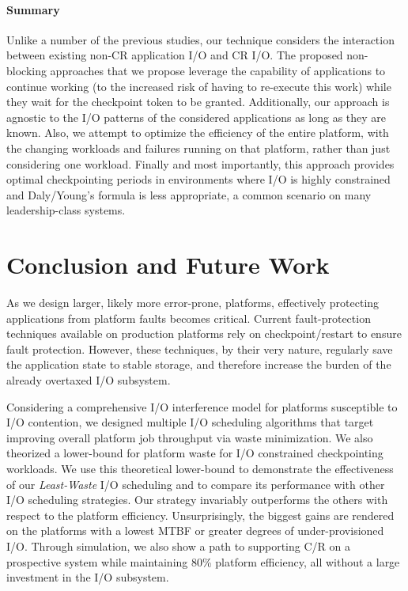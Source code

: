 \documentclass[conference,nofonttune]{IEEEtran}
\newcommand{\leastwaste}{\emph{Least-Waste}\xspace}
\def\cooperative{\leastwaste}
\begin{document}
\paragraph*{Summary}

Unlike a number of the previous studies, our
technique considers the interaction between existing non-CR
application I/O and CR I/O. The proposed non-blocking approaches that
we propose leverage the capability of applications to continue working
(to the increased risk of having to re-execute this work) while they
wait for the checkpoint token to be granted. Additionally, our
approach is agnostic to the I/O patterns of the considered
applications as long as they are known.  Also, we attempt to optimize
the efficiency of the entire platform, with the changing workloads and
failures running on that platform, rather than just considering one
workload. Finally and most importantly, this approach provides optimal
checkpointing periods in environments where I/O is highly constrained
and Daly/Young's formula is less appropriate, a common scenario on
many leadership-class systems.


%
\section{Conclusion and Future Work} \label{sec:conclusion}

As we design larger, likely more error-prone, platforms, effectively protecting
applications from platform faults becomes critical. Current fault-protection
techniques available on production platforms rely on checkpoint/restart to
ensure fault protection. However, these techniques, by their very nature,
regularly save the application state to stable storage, and therefore increase
the burden of the already overtaxed I/O subsystem.

Considering a comprehensive I/O interference model for platforms susceptible to I/O
contention, we designed multiple I/O scheduling algorithms that target improving
overall platform job throughput via waste minimization. We also theorized a
lower-bound for platform waste for I/O constrained checkpointing workloads. We use
this theoretical lower-bound to demonstrate the effectiveness of our \cooperative
I/O scheduling and to compare its performance with other I/O
scheduling strategies.  Our strategy invariably outperforms the others
with respect to the platform efficiency. Unsurprisingly, the biggest gains are
rendered on the platforms with a lowest MTBF or greater degrees of under-provisioned
I/O. Through simulation, we also show a path to supporting C/R on a prospective
system while maintaining 80\% platform efficiency, all without a large
investment in the I/O subsystem.
\end{document}
